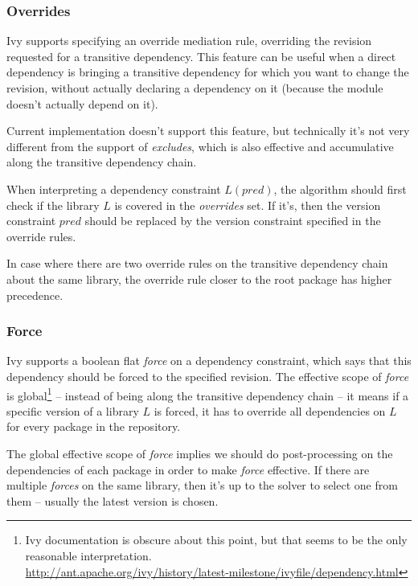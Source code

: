 \subsubsection{Overrides}

Ivy supports specifying an override mediation rule, overriding the revision requested for a transitive dependency. This feature can be useful when a direct dependency is bringing a transitive dependency for which you want to change the revision, without actually declaring a dependency on it (because the module doesn't actually depend on it).

Current implementation doesn't support this feature, but technically it's not very different from the support of \emph{excludes}, which is also effective and accumulative along the transitive dependency chain.

When interpreting a dependency constraint $L(pred)$, the algorithm should first check if the library $L$ is covered in the \emph{overrides} set. If it's, then the version constraint $pred$ should be replaced by the version constraint specified in the override rules.

In case where there are two override rules on the transitive dependency chain about the same library, the override rule closer to the root package has higher precedence.

\subsubsection{Force}

Ivy supports a boolean flat \emph{force} on a dependency constraint, which says that this dependency
should be forced to the specified revision. The effective scope of \emph{force} is global\footnote{Ivy documentation is obscure about this point, but that seems to be the only reasonable interpretation. \\\url{http://ant.apache.org/ivy/history/latest-milestone/ivyfile/dependency.html}} -- instead of being along the transitive dependency chain -- it means if a specific version of a library $L$ is forced, it has to override all dependencies on $L$ for every package in the repository.

The global effective scope of \emph{force} implies we should do post-processing on the dependencies of each package in order to make \emph{force} effective. If there are multiple \emph{forces} on the same library, then it's up to the solver to select one from them -- usually the latest version is chosen.

